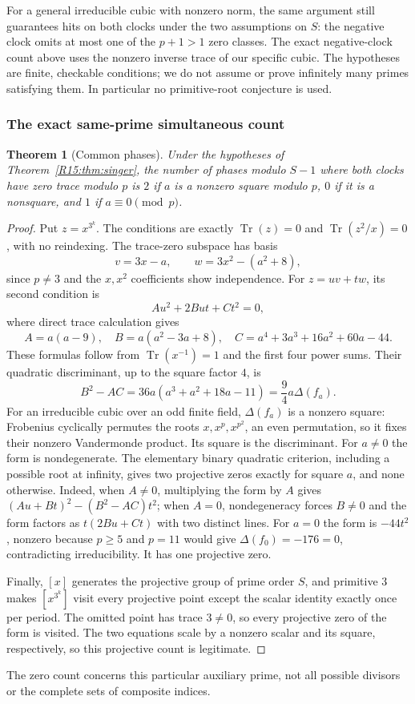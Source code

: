 \documentclass[11pt,a4paper]{article}
\newtheorem{theorem}{Theorem}[section]
\theoremstyle{definition}\newtheorem{definition}[theorem]{Definition}
\theoremstyle{remark}\newtheorem{remark}[theorem]{Remark}
\DeclareMathOperator{\Tr}{Tr}\DeclareMathOperator{\tr}{tr}\DeclareMathOperator{\Nm}{N}
\begin{document}
For a general irreducible cubic with nonzero norm, the same argument
still guarantees hits on both clocks under the two assumptions on $S$:
the negative clock omits at most one of the $p+1>1$ zero classes.
The exact negative-clock count above uses the nonzero inverse trace of
our specific cubic. The hypotheses are finite, checkable conditions;
we do not assume or prove infinitely many primes satisfying them.
In particular no primitive-root conjecture is used.

\subsubsection{The exact same-prime simultaneous count}

\begin{theorem}[Common phases]\label{R15:thm:common}
Under the hypotheses of Theorem~\ref{R15:thm:singer}, the number of
phases modulo $S-1$ where both clocks have zero trace modulo $p$ is
$2$ if $a$ is a nonzero square modulo $p$, $0$ if it is a nonsquare,
and $1$ if $a\equiv0\pmod p$.
\end{theorem}
\begin{proof}
Put $z=x^{3^k}$. The conditions are exactly
$\Tr(z)=0$ and $\Tr(z^2/x)=0$, with no reindexing.
The trace-zero subspace has basis
\[
 v=3x-a,\qquad w=3x^2-(a^2+8),
\]
since $p\ne3$ and the $x,x^2$ coefficients show independence.
For $z=uv+tw$, its second condition is
\[
 A u^2+2But+C t^2=0,
\]
where direct trace calculation gives
\[
 A=a(a-9),\quad B=a(a^2-3a+8),\quad
 C=a^4+3a^3+16a^2+60a-44.
\]
These formulas follow from $\Tr(x^{-1})=1$ and the first four
power sums. Their quadratic discriminant, up to the square factor $4$, is
\begin{equation}\label{R15:eq:quadratic-discriminant}
 B^2-AC=36a(a^3+a^2+18a-11)=\frac94 a\Delta(f_a).
\end{equation}
For an irreducible cubic over an odd finite field, $\Delta(f_a)$
is a nonzero square: Frobenius cyclically permutes the roots
$x,x^p,x^{p^2}$, an even permutation, so it fixes their nonzero
Vandermonde product. Its square is the discriminant.
For $a\ne0$ the form is nondegenerate. The elementary binary
quadratic criterion, including a possible root at infinity, gives
two projective zeros exactly for square $a$, and none otherwise.
Indeed, when $A\ne0$, multiplying the form by $A$ gives
$(Au+Bt)^2-(B^2-AC)t^2$; when $A=0$, nondegeneracy forces
$B\ne0$ and the form factors as $t(2Bu+Ct)$ with two distinct lines.
For $a=0$ the form is $-44t^2$, nonzero because $p\ge5$ and
$p=11$ would give $\Delta(f_0)=-176=0$, contradicting
irreducibility. It has one projective zero.

Finally, $[x]$ generates the projective group of prime order $S$,
and primitive $3$ makes $[x^{3^k}]$ visit every projective point
except the scalar identity exactly once per period. The omitted
point has trace $3\ne0$, so every projective zero of the form is
visited. The two equations scale by a nonzero scalar and its square,
respectively, so this projective count is legitimate.
\end{proof}
The zero count concerns this particular auxiliary prime, not all
possible divisors or the complete sets of composite indices.
\end{document}
